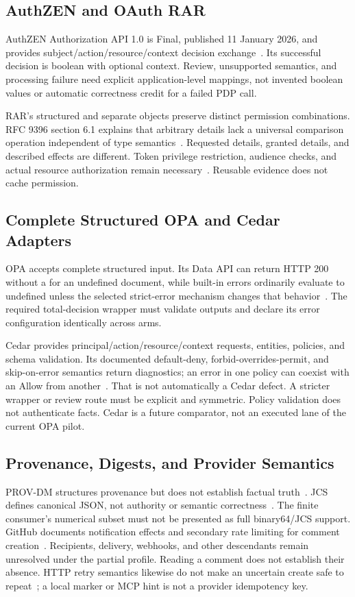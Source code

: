 \documentclass[11pt,letterpaper]{article}
\newcommand{\code}[1]{\texttt{\detokenize{#1}}}
\begin{document}
\subsection{AuthZEN and OAuth RAR}
AuthZEN Authorization API 1.0 is Final, published 11 January 2026, and provides
subject/action/resource/context decision exchange~\cite{authzen}. Its successful
decision is boolean with optional context. Review, unsupported semantics, and
processing failure need explicit application-level mappings, not invented
boolean values or automatic correctness credit for a failed PDP call.

RAR's structured \code{authorization_details} and separate objects preserve
distinct permission combinations. RFC 9396 section 6.1 explains that arbitrary details
lack a universal comparison operation independent of type semantics~\cite{rar}.
Requested details, granted details, and described effects are different.
Token privilege restriction, audience checks, and actual resource authorization
remain necessary~\cite{oauth-bcp}. Reusable evidence does not cache permission.

\subsection{Complete Structured OPA and Cedar Adapters}
OPA accepts complete structured input. Its Data API can return HTTP 200 without
a \code{result} for an undefined document, while built-in errors ordinarily
evaluate to undefined unless the selected strict-error mechanism changes that
behavior~\cite{opa-api,opa-lang}. The required total-decision wrapper must
validate outputs and declare its error configuration identically across arms.

Cedar provides principal/action/resource/context requests, entities, policies,
and schema validation. Its documented default-deny, forbid-overrides-permit,
and skip-on-error semantics return diagnostics; an error in one policy can
coexist with an Allow from another~\cite{cedar-auth,cedar-validation}. That is
not automatically a Cedar defect. A stricter wrapper or review route must be
explicit and symmetric. Policy validation does not authenticate facts. Cedar
is a future comparator, not an executed lane of the current OPA pilot.

\subsection{Provenance, Digests, and Provider Semantics}
PROV-DM structures provenance but does not establish factual truth~\cite{prov}.
JCS defines canonical JSON, not authority or semantic correctness~\cite{jcs}.
The finite consumer's numerical subset must not be presented as full
binary64/JCS support. GitHub documents notification effects and secondary rate
limiting for comment creation~\cite{github-comments}. Recipients, delivery,
webhooks, and other descendants remain unresolved under the partial profile.
Reading a comment does not establish their absence. HTTP retry semantics
likewise do not make an uncertain create safe to repeat~\cite{http}; a local
marker or MCP hint is not a provider idempotency key.
\end{document}
